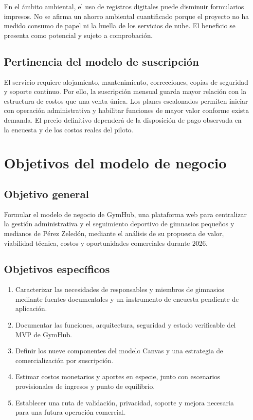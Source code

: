 En el ámbito ambiental, el uso de registros digitales puede disminuir formularios
impresos. No se afirma un ahorro ambiental cuantificado porque el proyecto no ha
medido consumo de papel ni la huella de los servicios de nube. El beneficio se
presenta como potencial y sujeto a comprobación.

\subsection{Pertinencia del modelo de suscripción}

El servicio requiere alojamiento, mantenimiento, correcciones, copias de
seguridad y soporte continuo. Por ello, la suscripción mensual guarda mayor
relación con la estructura de costos que una venta única. Los planes escalonados
permiten iniciar con operación administrativa y habilitar funciones de mayor
valor conforme exista demanda. El precio definitivo dependerá de la disposición
de pago observada en la encuesta y de los costos reales del piloto.

\section{Objetivos del modelo de negocio}

\subsection{Objetivo general}

Formular el modelo de negocio de GymHub, una plataforma web para centralizar la
gestión administrativa y el seguimiento deportivo de gimnasios pequeños y
medianos de Pérez Zeledón, mediante el análisis de su propuesta de valor,
viabilidad técnica, costos y oportunidades comerciales durante 2026.

\subsection{Objetivos específicos}

\begin{enumerate}
  \item Caracterizar las necesidades de responsables y miembros de gimnasios
  mediante fuentes documentales y un instrumento de encuesta pendiente de
  aplicación.
  \item Documentar las funciones, arquitectura, seguridad y estado verificable
  del MVP de GymHub.
  \item Definir los nueve componentes del modelo Canvas y una estrategia de
  comercialización por suscripción.
  \item Estimar costos monetarios y aportes en especie, junto con escenarios
  provisionales de ingresos y punto de equilibrio.
  \item Establecer una ruta de validación, privacidad, soporte y mejora necesaria
  para una futura operación comercial.
\end{enumerate}
